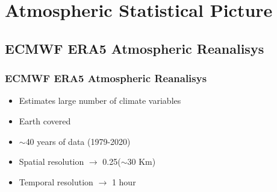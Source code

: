\documentclass[10pt,aspectratio=169]{beamer}
\begin{document}
\section{Atmospheric Statistical Picture}

\subsection{ECMWF ERA5 Atmospheric Reanalisys}

\begin{frame}
\frametitle{ECMWF ERA5 Atmospheric Reanalisys}

\begin{itemize}
\item<1-8> Estimates large number of climate variables
\item<2-8> Earth covered
\item<3-8> $\sim$40 years of data (1979-2020)
\item<4-8> Spatial resolution $\rightarrow$ 0.25\textdegree ($\sim$30 Km)
\item<5-8> Temporal resolution $\rightarrow$ 1 hour
\end{itemize}




\end{frame}
\end{document}
